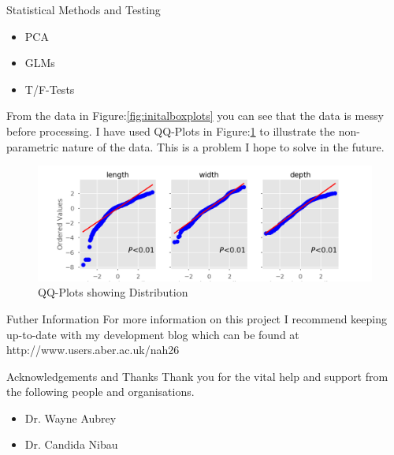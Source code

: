 \documentclass[final]{beamer}
\begin{document}
\begin{frame}{}
\begin{textblock}{27.7}
\begin{block}{Statistical Methods and Testing}
\begin{multicols}{2}
        \columnbreak

        \begin{itemize}
        \item PCA
        \item GLMs
        \item T/F-Tests
        \end{itemize}

      \end{multicols}

      From the data in Figure:\ref{fig:initalboxplots} you can see that the data is
      messy before processing. I have used QQ-Plots in Figure:\ref{fig:qq} to illustrate
      the non-parametric nature of the data. This is a problem I hope to solve in the future.
        \begin{figure}[htb]
          \centering
          \includegraphics[width=22cm]{qqplots.png}
          \caption{\label{fig:qq} QQ-Plots showing Distribution}
        \end{figure}       
      
    \end{block}

    \begin{block}{Futher Information}
      For more information on this project I recommend keeping up-to-date with my development blog
      which can be found at  http://www.users.aber.ac.uk/nah26

    \end{block}
    
    
    \begin{block}{Acknowledgements and Thanks}
      Thank you for the vital help and support from the following people and organisations.

      \begin{multicols}{3}

        \begin{itemize}
        \item{Dr. Wayne Aubrey}
        \item{Dr. Candida Nibau}


\end{itemize}
\end{multicols}
\end{block}
\end{textblock}
\end{frame}
\end{document}

